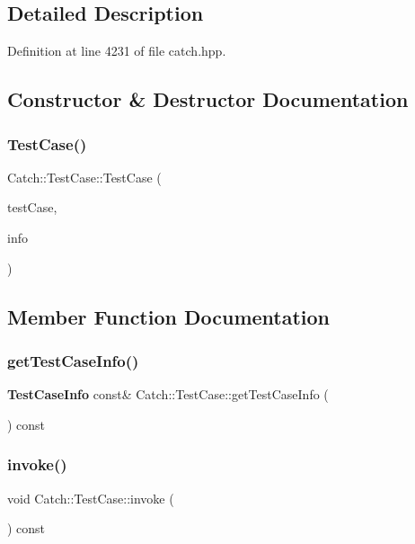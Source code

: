 \subsection{Detailed Description}


Definition at line 4231 of file catch.\+hpp.



\subsection{Constructor \& Destructor Documentation}
\mbox{\label{class_catch_1_1_test_case_aae5709fc1cb68e19ab0ac27e1ffd6a76}} 
\subsubsection{TestCase()}
{\footnotesize\ttfamily Catch\+::\+Test\+Case\+::\+Test\+Case (\begin{DoxyParamCaption}\item[{\textbf{ I\+Test\+Invoker} $\ast$}]{test\+Case,  }\item[{\textbf{ Test\+Case\+Info} \&\&}]{info }\end{DoxyParamCaption})}



\subsection{Member Function Documentation}
\mbox{\label{class_catch_1_1_test_case_a1ea0d79f49156cebea076fe1ba50d2b6}} 
\subsubsection{getTestCaseInfo()}
{\footnotesize\ttfamily \textbf{ Test\+Case\+Info} const\& Catch\+::\+Test\+Case\+::get\+Test\+Case\+Info (\begin{DoxyParamCaption}{ }\end{DoxyParamCaption}) const}

\mbox{\label{class_catch_1_1_test_case_a26f346c8446dded0562fe3818ae71651}} 
\subsubsection{invoke()}
{\footnotesize\ttfamily void Catch\+::\+Test\+Case\+::invoke (\begin{DoxyParamCaption}{ }\end{DoxyParamCaption}) const}

